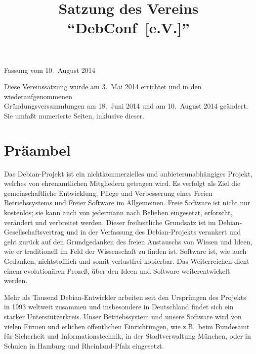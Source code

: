 \documentclass[draft]{scrartcl}
\newcommand{\VereinsName}{DebConf}
\begin{document}

\title{Satzung des Vereins "`\VereinsName\ [e.V.]"'}
\date{}
\author{}
\def\fassungsdatum{10.\ August 2014}

\begin{center}
  \LARGE \thetitle
\end{center}

\begin{flushright}
  Fassung vom \fassungsdatum
\end{flushright}

\pagestyle{scrheadings}
\clearscrheadfoot
{}

{\footnotesize Diese Vereinssatzung wurde am 3.\ Mai 2014 errichtet und in den
  wiederaufgenommenen \\ Gründungsversammlungen am 18.\ Juni 2014 und am 10.\
  August 2014 geändert.\\ Sie umfaßt \pageref{TotPages} numerierte Seiten,
  inklusive dieser.}

\bigskip

\section*{Präambel}\enlargethispage{\textheight}
\small

Das Debian-Projekt ist ein nichtkommerzielles und anbieterunabhängiges
Projekt, welches von ehrenamtlichen Mitgliedern getragen wird. Es verfolgt als
Ziel die gemeinschaftliche Entwicklung, Pflege und Verbesserung eines Freien
Betriebs\-systems und Freier Software im Allgemeinen. Freie Software ist nicht
nur kostenlos; sie kann auch von jedermann nach Belieben eingesetzt, erforscht,
verändert und verbreitet werden. Dieser freiheitliche Grundsatz ist im
Debian-Gesellschaftsvertrag und in der Verfassung des Debian-Projekts verankert
und geht zurück auf den Grundgedanken des freien Austauschs von Wissen und
Ideen, wie er traditionell im Feld der Wissenschaft zu finden ist. Software
ist, wie auch Gedanken, nichtstoff\/lich und somit verlustfrei kopierbar. Das
Weiterreichen dient einem evolutionären Prozeß, über den Ideen und Software
weiterentwickelt werden.

Mehr als Tausend Debian-Entwickler arbeiten seit den Ursprüngen des Projekts in
1993 weltweit zusammen und insbesondere in Deutschland findet sich ein starker
Un\-ter\-stüt\-zer\-kreis. Unser Betriebs\-system und unsere Software wird von
vielen Firmen und etlichen öffentlichen Einrichtungen, wie z.B.\ beim
Bundesamt für Sicherheit und Informationstechnik, in der Stadtverwaltung
München, oder in Schulen in Hamburg und Rheinland-Pfalz eingesetzt.
\end{document}
